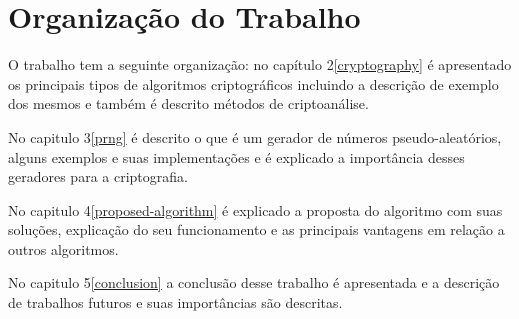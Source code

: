 \section{Organização do Trabalho}
\label{paper-organization}

O trabalho tem a seguinte organização: no capítulo 2\ref{cryptography} é apresentado os principais tipos de algoritmos criptográficos incluindo a descrição de exemplo dos mesmos e também é descrito métodos de criptoanálise.

No capitulo 3\ref{prng} é descrito o que é um gerador de números pseudo-aleatórios, alguns exemplos e suas implementações e é explicado a importância desses geradores para a criptografia. 

No capitulo 4\ref{proposed-algorithm} é explicado a proposta do algoritmo com suas soluções, explicação do seu funcionamento e as principais vantagens em relação a outros algoritmos.

No capitulo 5\ref{conclusion} a conclusão desse trabalho é apresentada e a descrição de trabalhos futuros e suas importâncias são descritas. 